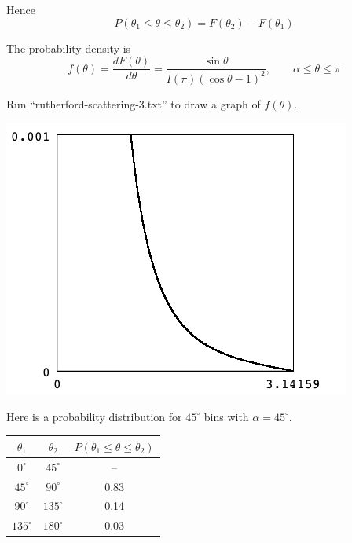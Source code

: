 \documentclass[12pt]{article}
\begin{document}
\noindent
Hence
\begin{equation*}
P(\theta_1\le\theta\le\theta_2)=F(\theta_2)-F(\theta_1)
\end{equation*}

\noindent
The probability density is
\begin{equation*}
f(\theta)=\frac{dF(\theta)}{d\theta}=\frac{\sin\theta}{I(\pi)(\cos\theta-1)^2},
\qquad\alpha\le\theta\le\pi
\end{equation*}

\noindent
Run ``rutherford-scattering-3.txt'' to draw a graph of $f(\theta)$.

\begin{center}
\includegraphics[scale=0.5]{rutherford-scattering-ss1.png}
\end{center}

\noindent
Here is a probability distribution for $45^\circ$ bins with $\alpha=45^\circ$.

\begin{center}
\begin{tabular}{|c|c|c|}
\hline
$\theta_1$ & $\theta_2$ & $P(\theta_1\le\theta\le\theta_2)$\\
\hline
$0^\circ$ & $45^\circ$ & -- \\
$45^\circ$ & $90^\circ$ & 0.83 \\
$90^\circ$ & $135^\circ$ & 0.14 \\
$135^\circ$ & $180^\circ$ & 0.03 \\
\hline
\end{tabular}
\end{center}
\end{document}
